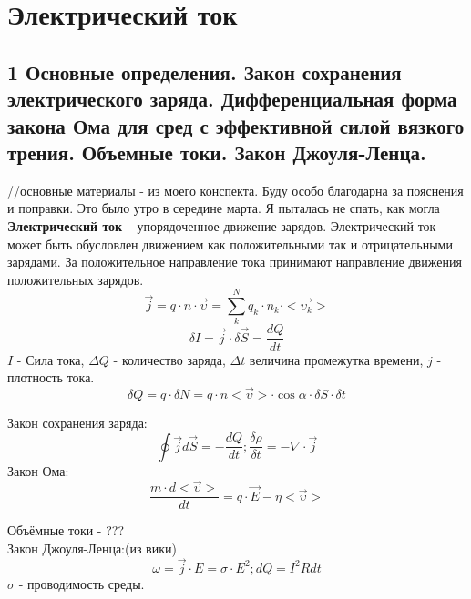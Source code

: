 \documentclass[a4paper,12pt]{article}
\begin{document}
\section{Электрический ток}
\subsection{1   Основные определения. Закон сохранения электрического заряда. Дифференциальная форма закона Ома для сред с эффективной силой вязкого трения. Объемные токи. Закон Джоуля-Ленца.}
//основные материалы - из моего конспекта. Буду особо благодарна за пояснения и поправки. Это было утро в середине марта. Я пыталась не спать, как могла\\
\textbf{Электрический ток} – упорядоченное движение зарядов. Электрический ток может быть обусловлен движением как положительными так и отрицательными зарядами. За положительное направление тока принимают направление движения положительных зарядов.\\
\begin{equation}
	\vec{j} = q \cdot n \cdot \vec{\upsilon} = \sum _k ^N q_k \cdot n_k \cdot <\vec{\upsilon _k}> 
\end{equation}
\begin{equation}
	\delta I = \vec{j} \cdot \delta \vec{S} = \frac{dQ}{dt}
\end{equation}
$I$ - Сила тока, $\Delta Q$ - количество заряда, $\Delta t$ величина промежутка времени, $j$ - плотность тока.\\
\begin{equation}
	\delta Q = q \cdot \delta N = q \cdot n <\vec{\upsilon}> \cdot \cos{\alpha} \cdot \delta S \cdot \delta t
\end{equation}

Закон сохранения заряда:\\
\begin{equation}
	\oint \vec{j} d \vec{S} = - \frac{dQ}{dt}; \frac{\delta \rho}{\delta t} = - \nabla \cdot \vec{j} 
\end{equation}
Закон Ома:\\
\begin{equation}
	\frac{m \cdot d<\vec{\upsilon}>}{dt} = q \cdot \vec{E} - \eta <\vec{\upsilon}>
\end{equation}

Объёмные токи - ???\\
Закон Джоуля-Ленца:(из вики)\\
\begin{equation}
	\omega = \vec{j} \cdot E = \sigma \cdot E^2; dQ = I^2Rdt
\end{equation}
$\sigma$ - проводимость среды.
\end{document}
